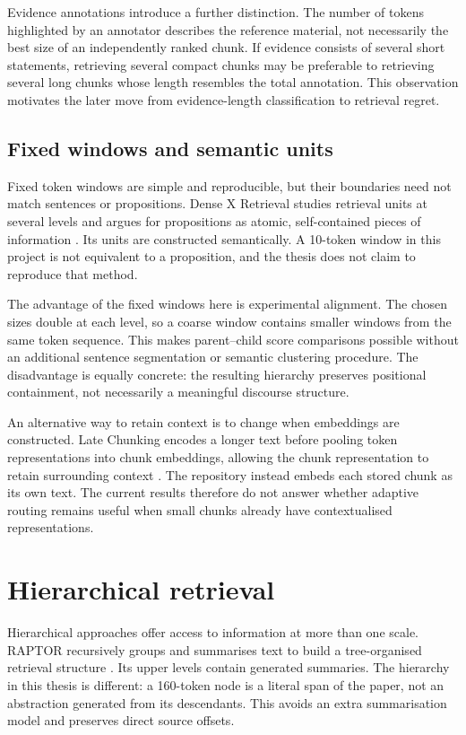 Evidence annotations introduce a further distinction. The number of
tokens highlighted by an annotator describes the reference material,
not necessarily the best size of an independently ranked chunk. If
evidence consists of several short statements, retrieving several
compact chunks may be preferable to retrieving several long chunks
whose length resembles the total annotation. This observation motivates
the later move from evidence-length classification to retrieval regret.

\subsection{Fixed windows and semantic units}
Fixed token windows are simple and reproducible, but their boundaries
need not match sentences or propositions. Dense X Retrieval studies
retrieval units at several levels and argues for propositions as atomic,
self-contained pieces of information \cite{chen2024densex}. Its units
are constructed semantically. A 10-token window in this project is not
equivalent to a proposition, and the thesis does not claim to reproduce
that method.

The advantage of the fixed windows here is experimental alignment. The
chosen sizes double at each level, so a coarse window contains smaller
windows from the same token sequence. This makes parent--child score
comparisons possible without an additional sentence segmentation or
semantic clustering procedure. The disadvantage is equally concrete:
the resulting hierarchy preserves positional containment, not
necessarily a meaningful discourse structure.

An alternative way to retain context is to change when embeddings are
constructed. Late Chunking encodes a longer text before pooling token
representations into chunk embeddings, allowing the chunk representation
to retain surrounding context \cite{gunther2024late}. The repository
instead embeds each stored chunk as its own text. The current results
therefore do not answer whether adaptive routing remains useful when
small chunks already have contextualised representations.

\section{Hierarchical retrieval}
Hierarchical approaches offer access to information at more than one
scale. RAPTOR recursively groups and summarises text to build a
tree-organised retrieval structure \cite{sarthi2024raptor}. Its upper
levels contain generated summaries. The hierarchy in this thesis is
different: a 160-token node is a literal span of the paper, not an
abstraction generated from its descendants. This avoids an extra
summarisation model and preserves direct source offsets.

